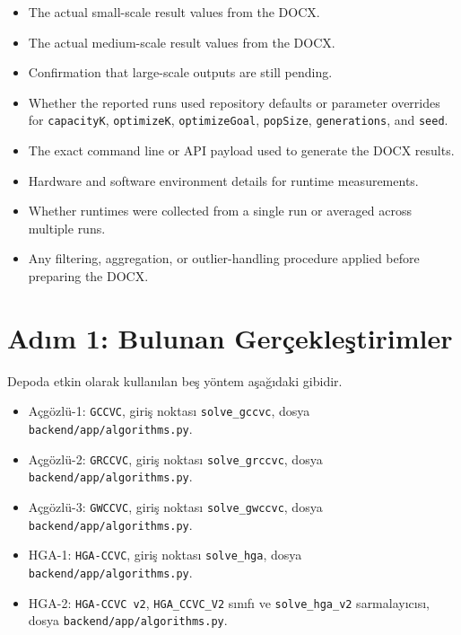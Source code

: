 \documentclass[11pt]{article}
\begin{document}
\begin{itemize}
    \item The actual small-scale result values from the DOCX.
    \item The actual medium-scale result values from the DOCX.
    \item Confirmation that large-scale outputs are still pending.
    \item Whether the reported runs used repository defaults or parameter overrides for \texttt{capacityK}, \texttt{optimizeK}, \texttt{optimizeGoal}, \texttt{popSize}, \texttt{generations}, and \texttt{seed}.
    \item The exact command line or API payload used to generate the DOCX results.
    \item Hardware and software environment details for runtime measurements.
    \item Whether runtimes were collected from a single run or averaged across multiple runs.
    \item Any filtering, aggregation, or outlier-handling procedure applied before preparing the DOCX.
\end{itemize}

\clearpage
{}

\section*{Adım 1: Bulunan Gerçekleştirimler}

Depoda etkin olarak kullanılan beş yöntem aşağıdaki gibidir.

\begin{itemize}
    \item Açgözlü-1: \texttt{GCCVC}, giriş noktası \texttt{solve\_gccvc}, dosya \texttt{backend/app/algorithms.py}.
    \item Açgözlü-2: \texttt{GRCCVC}, giriş noktası \texttt{solve\_grccvc}, dosya \texttt{backend/app/algorithms.py}.
    \item Açgözlü-3: \texttt{GWCCVC}, giriş noktası \texttt{solve\_gwccvc}, dosya \texttt{backend/app/algorithms.py}.
    \item HGA-1: \texttt{HGA-CCVC}, giriş noktası \texttt{solve\_hga}, dosya \texttt{backend/app/algorithms.py}.
    \item HGA-2: \texttt{HGA-CCVC v2}, \texttt{HGA\_CCVC\_V2} sınıfı ve \texttt{solve\_hga\_v2} sarmalayıcısı, dosya \texttt{backend/app/algorithms.py}.
\end{itemize}
\end{document}
